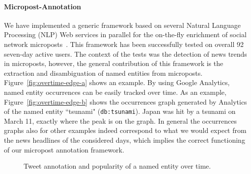 \documentclass[runningheads,a4paper]{llncs}
\begin{document}
\paragraph{\bf{Micropost-Annotation}}
We have implemented a generic framework based on several Natural Language Processing (NLP) Web services in parallel for the on-the-fly enrichment of social network microposts~\cite{twittertrends}. This framework has been successfully tested on overall 92 seven-day active users. The context of the tests was the detection of news trends in microposts, however, the general contribution of this framework is the extraction and disambiguation of named entities from microposts. Figure~\ref{fig:overtime-edge-a} shows an example. By using Google Analytics, named entity occurrences can be easily tracked over time. As an example, Figure~\ref{fig:overtime-edge-b} shows the occurrences graph generated by Analytics of the named entity ``tsunami" (\texttt{db:tsunami}). Japan was hit by a tsunami on March 11, exactly where the peak is on the graph. In general the occurrences graphs also for other examples indeed correspond to what we would expect from the news headlines of the considered days, which implies the correct functioning of our micropost annotation framework.

\begin{figure}[htb!]
  \begin{center}
\hspace{5pt}
  \caption{Tweet annotation and popularity of a named entity over time.}
  \label{fig:overtime}
  \end{center}  
\end{figure}
\end{document}
